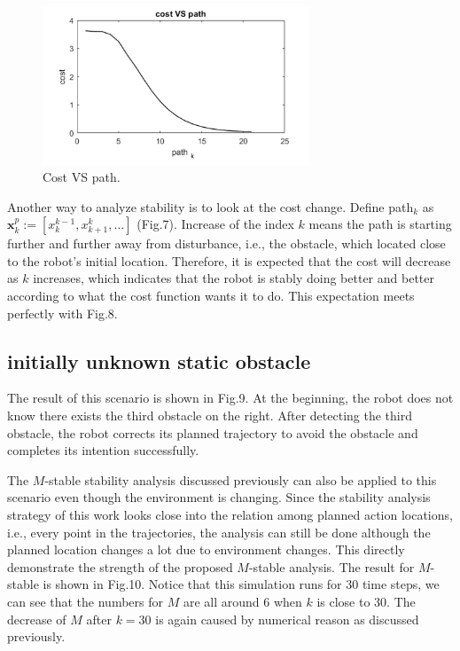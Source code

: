 \documentclass{ifacconf}
\begin{document}
\begin{figure}[htbp]
\begin{center}
\includegraphics[width=8cm]{src/1_3.png}
\caption{Cost VS path.}
\label{fig: mpc}
\end{center}
\end{figure}

Another way to analyze stability is to look at the cost change. Define path$_k$ as $\mathbf{x}_{k}^{p} := [x_{k}^{k-1},x_{k+1}^{k},\ldots]$ (Fig.7). Increase of the index $k$ means the path is starting further and further away from disturbance, i.e., the obstacle, which located close to the robot's initial location. Therefore, it is expected that the cost will decrease as $k$ increases, which indicates that the robot is stably doing better and better according to what the cost function wants it to do. This expectation meets perfectly with Fig.8. 

\subsection{initially unknown static obstacle}

The result of this scenario is shown in Fig.9. At the beginning, the robot does not know there exists the third obstacle on the right. After detecting the third obstacle, the robot corrects its planned trajectory to avoid the obstacle and completes its intention successfully.

The $M$-stable stability analysis discussed previously can also be applied to this scenario even though the environment is changing. Since the stability analysis strategy of this work looks close into the relation among planned action locations, i.e., every point in the trajectories, the analysis can still be done although the planned location changes a lot due to environment changes. This directly demonstrate the strength of the proposed $M$-stable analysis. The result for $M$-stable is shown in Fig.10. Notice that this simulation runs for 30 time steps, we can see that the numbers for $M$ are all around 6 when $k$ is close to 30. The decrease of $M$ after $k=30$ is again caused by numerical reason as discussed previously.     
\end{document}
